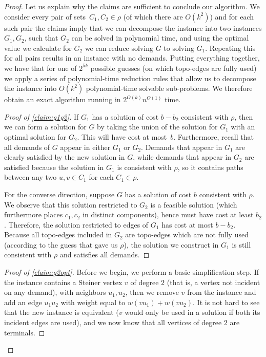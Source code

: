 \begin{proof}
Let us explain why the claims are sufficient to conclude our algorithm. We
consider every pair of sets~$C_1,C_2\in\rho$ (of which there are $O(k^2)$) and
for each such pair the claims imply that we can decompose the instance into two
instances $G_1,G_2$, such that $G_2$ can be solved in polynomial time, and
using the optimal value we calculate for $G_2$ we can reduce solving $G$ to
solving $G_1$. Repeating this for all  pairs results in an instance with no
demands. Putting everything together, we have that for one of $2^{5k}$ possible
guesses (on which topo-edges are fully used) we apply a series of
polynomial-time reduction rules that allow us to decompose the instance into
$O(k^2)$ polynomial-time solvable sub-problems. We therefore obtain an exact
algorithm running in $2^{O(k)}n^{O(1)}$ time. \qedhere


%
\begin{proof}[Proof of \cref{claim:g1g2}]

If $G_1$ has a solution of cost $b-b_2$ consistent with $\rho$, then we can form
a solution for $G$ by taking the union of the solution for $G_1$ with an
optimal solution for $G_2$.  This will have cost at most~$b$. Furthermore,
recall that all demands of $G$ appear in either $G_1$ or $G_2$. Demands that
appear in $G_1$ are clearly satisfied by the new solution in $G$, while demands
that appear in $G_2$ are satisfied because the solution in $G_1$ is consistent
with $\rho$, so it contains paths between any two $u,v\in C_1$ for each $C_1\in
\rho$.

For the converse direction, suppose $G$ has a solution of cost $b$ consistent
with $\rho$. We observe that this solution restricted to $G_2$ is a feasible
solution (which furthermore places $c_1,c_2$ in distinct components), hence
must have cost at least $b_2$. Therefore, the solution restricted to edges of
$G_1$ has cost at most $b-b_2$. Because all topo-edges included in $G_2$ are
topo-edges which are not fully used (according to the guess that gave us
$\rho$), the solution we construct in $G_1$ is still consistent with $\rho$ and
satisfies all demands.  \end{proof}
%

%
\begin{proof}[Proof of \cref{claim:g2opt}]

Before we begin, we perform a basic simplification step. If the instance
contains a Steiner vertex $v$ of degree $2$ (that is, a vertex not incident on
any demand), with neighbors $u_1,u_2$, then we remove $v$ from the instance and
add an edge $u_1u_2$ with weight equal to $w(vu_1)+w(vu_2)$. It is not hard to
see that the new instance is equivalent ($v$ would only be used in a solution
if both its incident edges are used), and we now know that all vertices of
degree $2$ are terminals.


\end{proof}
\end{proof}

